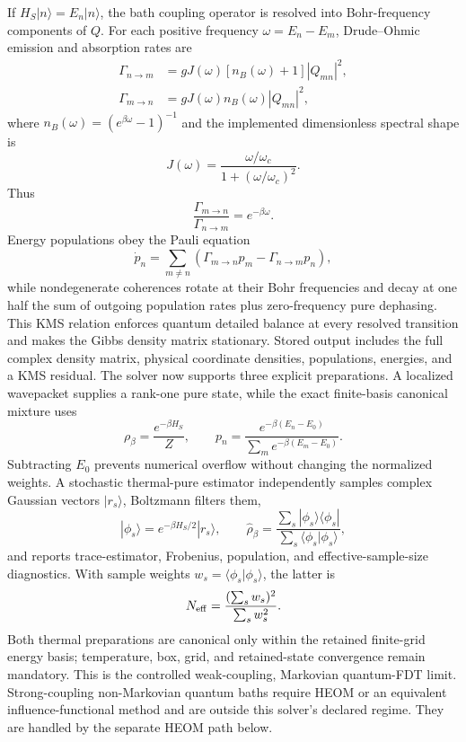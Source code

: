 \documentclass[11pt]{article}
\begin{document}
If $H_S|n\rangle=E_n|n\rangle$, the bath
coupling operator is resolved into Bohr-frequency components of $Q$. For each
positive frequency $\omega=E_n-E_m$, Drude--Ohmic emission and absorption rates
are
\begin{align}
 \Gamma_{n\rightarrow m} &= gJ(\omega)[n_B(\omega)+1]|Q_{mn}|^2,\\
 \Gamma_{m\rightarrow n} &= gJ(\omega)n_B(\omega)|Q_{mn}|^2,
\end{align}
where $n_B(\omega)=(e^{\beta\omega}-1)^{-1}$ and the implemented dimensionless
spectral shape is
\begin{equation}
 J(\omega)=\frac{\omega/\omega_c}{1+(\omega/\omega_c)^2}.
\end{equation}
Thus
\begin{equation}
 \frac{\Gamma_{m\rightarrow n}}{\Gamma_{n\rightarrow m}}
=e^{-\beta\omega}.
\end{equation}
Energy populations obey the Pauli equation
\begin{equation}
 \dot p_n=\sum_{m\ne n}\left(\Gamma_{m\rightarrow n}p_m
 -\Gamma_{n\rightarrow m}p_n\right),
\end{equation}
while nondegenerate coherences rotate at their Bohr frequencies and decay at one
half the sum of outgoing population rates plus zero-frequency pure dephasing.
This KMS relation enforces quantum detailed balance at every resolved transition
and makes the Gibbs density matrix stationary. Stored output includes the full
complex density matrix, physical coordinate densities, populations, energies,
and a KMS residual. The solver now supports three explicit preparations. A localized
wavepacket supplies a rank-one pure state, while the exact finite-basis canonical
mixture uses
\begin{equation}
 \rho_\beta=\frac{e^{-\beta H_S}}{Z},\qquad
 p_n=\frac{e^{-\beta(E_n-E_0)}}{\sum_m e^{-\beta(E_m-E_0)}}.
\end{equation}
Subtracting $E_0$ prevents numerical overflow without changing the normalized
weights. A stochastic thermal-pure estimator independently samples complex Gaussian
vectors $|r_s\rangle$, Boltzmann filters them,
\begin{equation}
 |\phi_s\rangle=e^{-\beta H_S/2}|r_s\rangle,\qquad
 \widehat\rho_\beta=
 \frac{\sum_s|\phi_s\rangle\langle\phi_s|}
      {\sum_s\langle\phi_s|\phi_s\rangle},
\end{equation}
and reports trace-estimator, Frobenius, population, and effective-sample-size
diagnostics. With sample weights $w_s=\langle\phi_s|\phi_s\rangle$, the latter is
\begin{equation}
 N_{\rm eff}=\frac{(\sum_s w_s)^2}{\sum_s w_s^2}.
\end{equation}
Both thermal preparations are canonical only within the retained finite-grid energy
basis; temperature, box, grid, and retained-state convergence remain mandatory.
This is the controlled weak-coupling, Markovian quantum-FDT
limit. Strong-coupling non-Markovian quantum baths require HEOM or an equivalent
influence-functional method and are outside this solver's declared regime. They
are handled by the separate HEOM path below.
\end{document}
